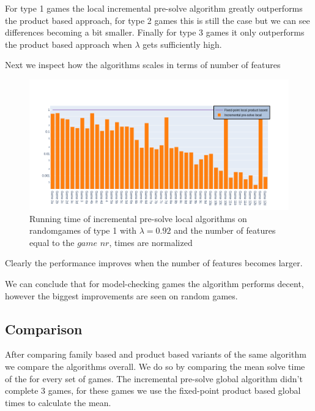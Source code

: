 For type 1 games the local incremental pre-solve algorithm greatly outperforms the product based approach, for type 2 games this is still the case but we can see differences becoming a bit smaller. Finally for type 3 games it only outperforms the product based approach when $\lambda$ gets sufficiently high.

Next we inspect how the algorithms scales in terms of number of features
\begin{figure}[H]
	\includegraphics[width=1\linewidth]{"results/randomscalegames/Fixed-point local product based_Incremental pre-solve local_"}
	\caption{Running time of incremental pre-solve local algorithms on randomgames of type 1 with $\lambda = 0.92$ and the number of features equal to the $\textit{game nr}$, times are normalized}
	\label{fig:elevatorzlnks}
\end{figure}%
Clearly the performance improves when the number of features becomes larger.

We can conclude that for model-checking games the algorithm performs decent, however the biggest improvements are seen on random games.
\subsection{Comparison}
After comparing family based and product based variants of the same algorithm we compare the algorithms overall. We do so by comparing the mean solve time of the for every set of games. The incremental pre-solve global algorithm didn't complete 3 games, for these games we use the fixed-point product based global times to calculate the mean.

